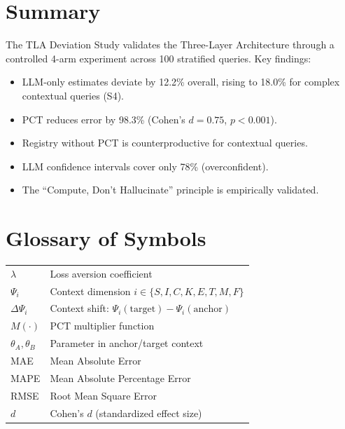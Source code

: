 
\section{Summary}

\begin{tcolorbox}[colback=falightgray, colframe=fadarkblue, title=Summary]
The TLA Deviation Study validates the Three-Layer Architecture through
a controlled 4-arm experiment across 100 stratified queries. Key findings:

\begin{itemize}
\item LLM-only estimates deviate by 12.2\% overall, rising to 18.0\%
  for complex contextual queries (S4).
\item PCT reduces error by 98.3\% (Cohen's $d = 0.75$, $p < 0.001$).
\item Registry without PCT is counterproductive for contextual queries.
\item LLM confidence intervals cover only 78\% (overconfident).
\item The ``Compute, Don't Hallucinate'' principle is empirically validated.
\end{itemize}
\end{tcolorbox}

\section{Glossary of Symbols}

\begin{tabular}{ll}
$\lambda$ & Loss aversion coefficient \\
$\Psi_i$ & Context dimension $i \in \{S, I, C, K, E, T, M, F\}$ \\
$\Delta\Psi_i$ & Context shift: $\Psi_i(\text{target}) - \Psi_i(\text{anchor})$ \\
$M(\cdot)$ & PCT multiplier function \\
$\theta_A, \theta_B$ & Parameter in anchor/target context \\
MAE & Mean Absolute Error \\
MAPE & Mean Absolute Percentage Error \\
RMSE & Root Mean Square Error \\
$d$ & Cohen's $d$ (standardized effect size) \\
\end{tabular}

